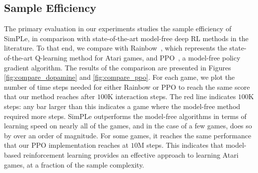 \subsection{Sample Efficiency}
The primary evaluation in our experiments studies the sample efficiency of SimPLe, in comparison with state-of-the-art model-free deep RL methods in the literature. To that end, we compare with  Rainbow~\cite{rainbow,DBLP:journals/corr/abs-1812-06110}, which represents the state-of-the-art Q-learning method for Atari games, and PPO~\cite{ppo}, a model-free policy gradient algorithm. The results of the comparison are presented in Figures \ref{fig:compare_dopamine} and \ref{fig:compare_ppo}. For each game, we plot the number of time steps needed for either Rainbow or PPO to reach the same score that our method reaches after $100$K interaction steps. The red line indicates $100$K steps: any bar larger than this indicates a game where the model-free method required more steps. SimPLe outperforms the model-free algorithms in terms of learning speed on nearly all of the games, and in the case of a few games, does so by over an order of magnitude. For some games, it reaches the same performance that our PPO implementation reaches at $10$M steps. This indicates that model-based reinforcement learning provides an effective approach to learning Atari games, at a fraction of the sample complexity.

